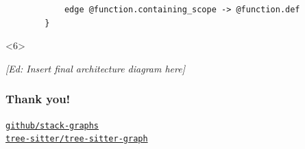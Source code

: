 \documentclass[aspectratio=169]{beamer}
\begin{document}
\begin{frame}[fragile]
\begin{center}
\begin{minipage}{0.75\textwidth}
\begin{minipage}{15em}
\begin{uncoverenv}
\begin{verbatim}
            edge @function.containing_scope -> @function.def
        }
    \end{verbatim}
    \end{uncoverenv}
    \begin{uncoverenv}<6>
    \begin{center}
    \end{center}
    \end{uncoverenv}
    \end{minipage}

    \end{minipage}
    \end{center}
\end{frame}


\begin{frame}
    \emph{[Ed: Insert final architecture diagram here]}
\end{frame}


\begin{frame}
    \frametitle{Thank you!}
    \href{https://github.com/github/stack-graphs}{\texttt{github/stack-graphs}} \\
    \href{https://github.com/tree-sitter/tree-sitter-graph}{\texttt{tree-sitter/tree-sitter-graph}}
\end{frame}
\end{document}

